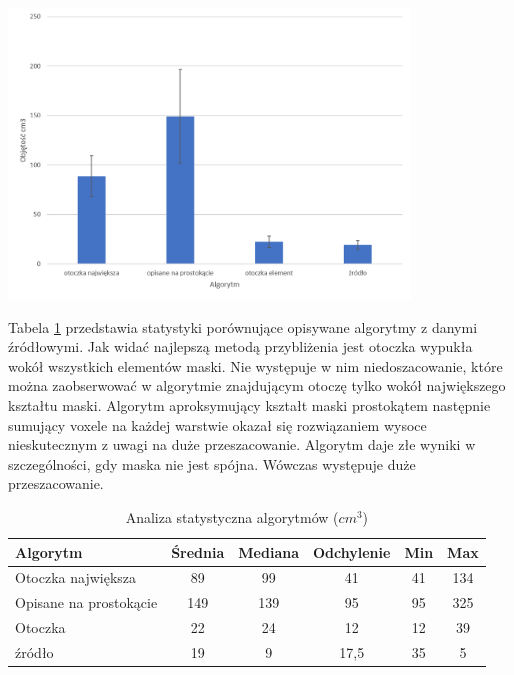 \documentclass[a4paper,11pt,twoside]{report}
\theoremstyle{definition}
\begin{document}
\begin{minipage}[h]{\linewidth}
	\centering
	\includegraphics[width=0.8\textwidth]{WynikiObjetosc.png}
\end{minipage}

Tabela \ref{Analiza statystyczna algorytmów} przedstawia statystyki porównujące opisywane algorytmy z danymi źródłowymi. Jak widać najlepszą metodą przybliżenia jest otoczka wypukła wokół wszystkich elementów maski. Nie występuje w nim niedoszacowanie, które można zaobserwować w algorytmie znajdującym otoczę tylko wokół największego kształtu maski. Algorytm aproksymujący kształt maski prostokątem następnie sumujący voxele na każdej warstwie okazał się rozwiązaniem wysoce nieskutecznym z uwagi na duże przeszacowanie. Algorytm daje złe wyniki w szczególności, gdy maska nie jest spójna. Wówczas występuje duże przeszacowanie.

\begin{table}[h!]
\caption{Analiza statystyczna algorytmów ($cm^3$)}
\centering
\begin{tabular}{|l|c|c|c|c|c|} \hline  
Algorytm	            & Średnia	& Mediana	& Odchylenie	& Min  	& Max \\ \hline
Otoczka największa	    & 89        & 99        & 41	            & 41	        & 134 \\ \hline
Opisane na prostokącie	& 149       & 139       & 95	            & 95	        & 325 \\ \hline
Otoczka	                & 22        & 24        & 12	            & 12	        & 39  \\ \hline
źródło	                & 19	    & 9	        & 17,5	            & 35            & 5   \\ \hline


\end{tabular}
\label{Analiza statystyczna algorytmów}
\end{table}
\end{document}
